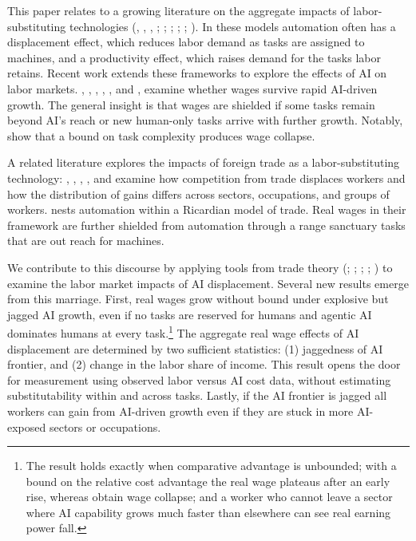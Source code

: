 \documentclass[11pt]{article}
\begin{document}
This paper relates to a growing literature on the aggregate impacts
of labor-substituting technologies (\citet{zeira1998}, \citet{aa2011},
\citet{ar2018}, \citet{ar2022}; \citet{ho2022}; \citet{mrr2022};
\citet{mr2022}; \citet{kpss2023}; \citet{at2025}). In these models
automation often has a displacement effect, which reduces labor demand
as tasks are assigned to machines, and a productivity effect, which
raises demand for the tasks labor retains. Recent work extends these
frameworks to explore the effects of AI on labor markets. \citet{ajj2019},
\citet{nordhaus2021}, \citet{tk2023}, \citet{ks2024}, \citet{jt2026},
and \citet{acemoglu2025}, examine whether wages survive rapid AI-driven
growth. The general insight is that wages are shielded if some tasks
remain beyond AI's reach or new human-only tasks arrive with further
growth. Notably, \citet{ks2024} show that a bound on task complexity
produces wage collapse.

A related literature explores the impacts of foreign trade as a labor-substituting
technology: \citet{adh2013}, \citet{cdp2019}, \citet{traiberman2019},
\citet{dk2017}, and \citet{gry2023} examine how competition from
trade displaces workers and how the distribution of gains differs
across sectors, occupations, and groups of workers. \citet{abr2023}
nests automation within a Ricardian model of trade. Real wages in
their framework are further shielded from automation through a range
sanctuary tasks that are out reach for machines.

We contribute to this discourse by applying tools from trade theory
(\citet{ek2002}; \citet{acr2012}; \citet{gry2023}; \citet{cv2015};
\citet{cp2015}) to examine the labor market impacts of AI displacement.
Several new results emerge from this marriage. First, real wages grow
without bound under explosive but jagged AI growth, even if no tasks
are reserved for humans and agentic AI dominates humans at every task.\footnote{The result holds exactly when comparative advantage is unbounded;
with a bound on the relative cost advantage the real wage plateaus
after an early rise, whereas \citet{ks2024} obtain wage collapse;
and a worker who cannot leave a sector where AI capability grows much
faster than elsewhere can see real earning power fall.} The aggregate real wage effects of AI displacement are determined
by two sufficient statistics: (1) jaggedness of AI frontier, and (2)
change in the labor share of income. This result opens the door for
measurement using observed labor versus AI cost data, without estimating
substitutability within and across tasks. Lastly, if the AI frontier
is jagged all workers can gain from AI-driven growth even if they
are stuck in more AI-exposed sectors or occupations.
\end{document}
